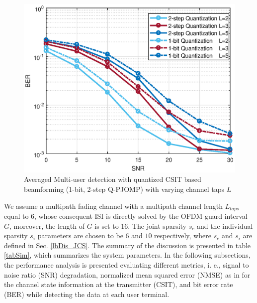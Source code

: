 \begin{figure}[h!]
    \centering
\includegraphics[scale=0.8]{figures/fig_ch_rec/JOMP_L.eps}
\caption{Averaged Multi-user detection with quantized CSIT based beamforming (1-bit, 2-step Q-PJOMP) with varying channel taps $L$ }
\label{Q-PJOMP_L}
\end{figure}
We assume a multipath fading channel with a multipath channel length $L_{taps}$ equal to $6$, whose consequent ISI is directly solved by the OFDM guard interval $G$, moreover, the length of $G$ is set to $16$. The joint sparsity $s_c$ and the individual sparsity $s_i$  parameters are chosen to be  $6$ and  $10$ respectively, where $s_c$ and $s_i$ are defined in Sec. \ref{lbDis_JCS}. 
The summary of the discussion is presented in table \ref{tabSim}, which summarizes the system parameters. In the following subsections, the performance analysis is presented evaluating different metrics, i. e., signal to noise ratio (SNR) degradation, normalized mean squared error (NMSE) as in \cite{mainref-joint}  
for the channel state information at the transmitter (CSIT), and bit error rate (BER) while detecting the data at each user terminal. \\
